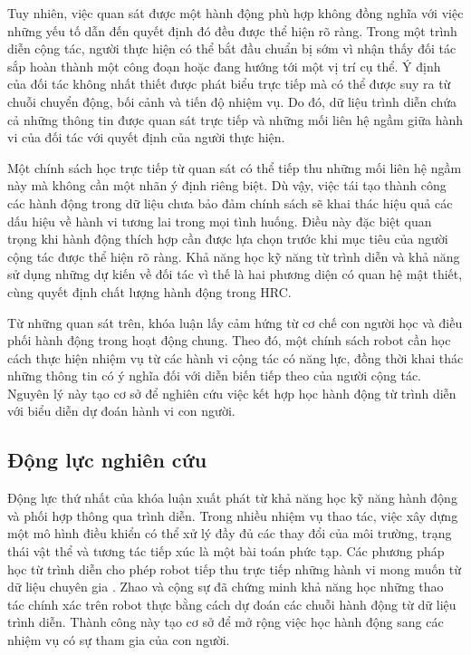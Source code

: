 Tuy nhiên, việc quan sát được một hành động phù hợp không đồng nghĩa với việc những yếu tố dẫn đến quyết định đó đều được thể hiện rõ ràng. Trong một trình diễn cộng tác, người thực hiện có thể bắt đầu chuẩn bị sớm vì nhận thấy đối tác sắp hoàn thành một công đoạn hoặc đang hướng tới một vị trí cụ thể. Ý định của đối tác không nhất thiết được phát biểu trực tiếp mà có thể được suy ra từ chuỗi chuyển động, bối cảnh và tiến độ nhiệm vụ. Do đó, dữ liệu trình diễn chứa cả những thông tin được quan sát trực tiếp và những mối liên hệ ngầm giữa hành vi của đối tác với quyết định của người thực hiện.

Một chính sách học trực tiếp từ quan sát có thể tiếp thu những mối liên hệ ngầm này mà không cần một nhãn ý định riêng biệt. Dù vậy, việc tái tạo thành công các hành động trong dữ liệu chưa bảo đảm chính sách sẽ khai thác hiệu quả các dấu hiệu về hành vi tương lai trong mọi tình huống. Điều này đặc biệt quan trọng khi hành động thích hợp cần được lựa chọn trước khi mục tiêu của người cộng tác được thể hiện rõ ràng. Khả năng học kỹ năng từ trình diễn và khả năng sử dụng những dự kiến về đối tác vì thế là hai phương diện có quan hệ mật thiết, cùng quyết định chất lượng hành động trong HRC.

Từ những quan sát trên, khóa luận lấy cảm hứng từ cơ chế con người học và điều phối hành động trong hoạt động chung. Theo đó, một chính sách robot cần học cách thực hiện nhiệm vụ từ các hành vi cộng tác có năng lực, đồng thời khai thác những thông tin có ý nghĩa đối với diễn biến tiếp theo của người cộng tác. Nguyên lý này tạo cơ sở để nghiên cứu việc kết hợp học hành động từ trình diễn với biểu diễn dự đoán hành vi con người.


\subsection{Động lực nghiên cứu}

Động lực thứ nhất của khóa luận xuất phát từ khả năng học kỹ năng hành động và phối hợp thông qua trình diễn. Trong nhiều nhiệm vụ thao tác, việc xây dựng một mô hình điều khiển có thể xử lý đầy đủ các thay đổi của môi trường, trạng thái vật thể và tương tác tiếp xúc là một bài toán phức tạp. Các phương pháp học từ trình diễn cho phép robot tiếp thu trực tiếp những hành vi mong muốn từ dữ liệu chuyên gia \cite{argall2009asurveyrobotlearning}. Zhao và cộng sự \cite{zhao2023learningfinegrained} đã chứng minh khả năng học những thao tác chính xác trên robot thực bằng cách dự đoán các chuỗi hành động từ dữ liệu trình diễn. Thành công này tạo cơ sở để mở rộng việc học hành động sang các nhiệm vụ có sự tham gia của con người.

